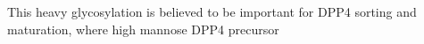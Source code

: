 This heavy glycosylation is believed to be important for DPP4 sorting and maturation, where high mannose DPP4 precursor\cite{Matter_1991}